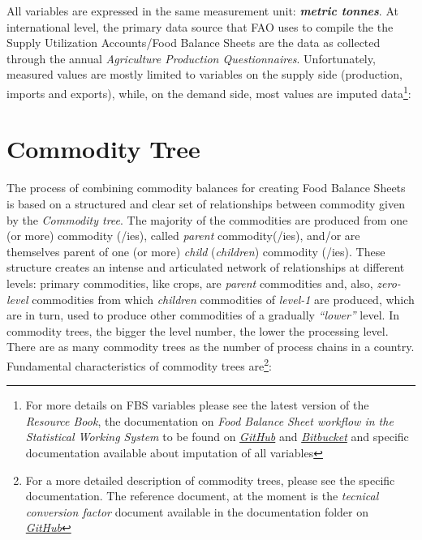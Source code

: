 \documentclass[]{article}
\let\rmarkdownfootnote\footnote%
\def\footnote{\protect\rmarkdownfootnote}
\begin{document}
All variables are expressed in the same measurement unit:
\textbf{\emph{metric tonnes}}. At international level, the primary data
source that FAO uses to compile the the Supply Utilization Accounts/Food
Balance Sheets are the data as collected through the annual
\emph{Agriculture Production Questionnaires}. Unfortunately, measured
values are mostly limited to variables on the supply side (production,
imports and exports), while, on the demand side, most values are imputed
data\footnote{For more details on FBS variables please see the latest
  version of the \emph{Resource Book}, the documentation on \emph{Food
  Balance Sheet workflow in the Statistical Working System} to be found
  on
  \href{https://github.com/SWS-Methodology/faoswsStandardization/tree/master/documentation}{\emph{GitHub}}
  and \href{https://sdlc.fao.org/bitbucket/projects}{\emph{Bitbucket}}
  and specific documentation available about imputation of all variables}:

\section*{Commodity Tree}\label{commodity-tree}

The process of combining commodity balances for creating Food Balance
Sheets is based on a structured and clear set of relationships between
commodity given by the \emph{Commodity tree}. The majority of the
commodities are produced from one (or more) commodity (/ies), called
\emph{parent} commodity(/ies), and/or are themselves parent of one (or
more) \emph{child} (\emph{children}) commodity (/ies). These structure
creates an intense and articulated network of relationships at different
levels: primary commodities, like crops, are \emph{parent} commodities
and, also, \emph{zero-level} commodities from which \emph{children}
commodities of \emph{level-1} are produced, which are in turn, used to
produce other commodities of a gradually \emph{``lower''} level. In
commodity trees, the bigger the level number, the lower the processing
level. There are as many commodity trees as the number of process chains
in a country. Fundamental characteristics of commodity trees
are\footnote{For a more detailed description of commodity trees, please
  see the specific documentation. The reference document, at the moment
  is the \emph{tecnical conversion factor} document available in the
  documentation folder on
  \href{https://github.com/SWS-Methodology/faoswsStandardization/tree/master/documentation}{\emph{GitHub}}}:
\end{document}
